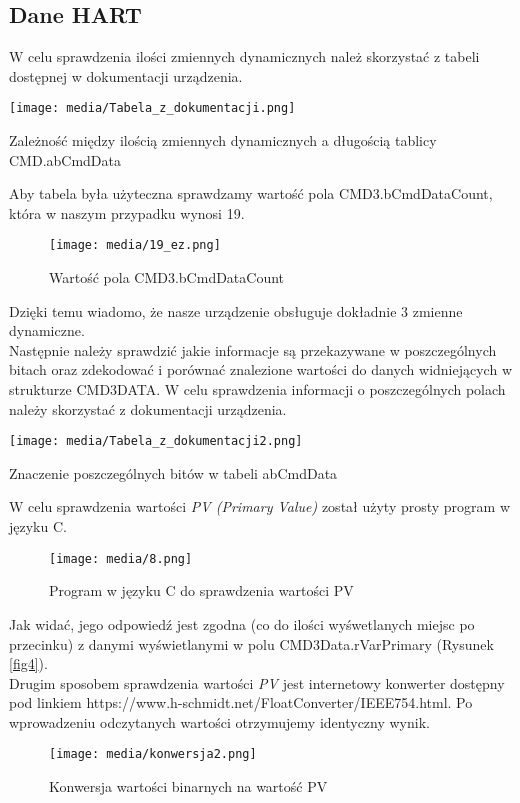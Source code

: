 \documentclass{article}
\begin{document}
\subsection{Dane HART}
W celu sprawdzenia ilości zmiennych dynamicznych należ skorzystać z  tabeli dostępnej w dokumentacji urządzenia. 
\begin{table}[H]
    \centering
    \texttt{[image: media/Tabela\_z\_dokumentacji.png]}
    \caption{Zależność między ilością zmiennych dynamicznych a długością tablicy CMD.abCmdData}
\end{table}
Aby tabela była użyteczna sprawdzamy wartość pola CMD3.bCmdDataCount, która w naszym przypadku wynosi 19.
\begin{figure}[H]
    \centering
    \texttt{[image: media/19\_ez.png]}
    \caption{Wartość pola CMD3.bCmdDataCount}
\end{figure}
Dzięki temu wiadomo, że nasze urządzenie obsługuje dokładnie 3 zmienne dynamiczne.\\

Następnie należy sprawdzić jakie informacje są przekazywane w poszczególnych bitach oraz zdekodować i porównać znalezione wartości do danych widniejących w strukturze CMD3DATA. W celu sprawdzenia informacji o poszczególnych polach należy skorzystać z dokumentacji urządzenia.
\begin{table}[H]
    \centering
    \texttt{[image: media/Tabela\_z\_dokumentacji2.png]}
    \caption{Znaczenie poszczególnych bitów w tabeli abCmdData}
\end{table}
W celu sprawdzenia wartości \textit{PV (Primary Value)} został użyty prosty program w języku C. 
\begin{figure}[H]
    \centering
    \texttt{[image: media/8.png]}
    \caption{Program w języku C do sprawdzenia wartości PV}
\end{figure}
Jak widać, jego odpowiedź jest zgodna (co do ilości wyśwetlanych miejsc po przecinku) z danymi wyświetlanymi w polu CMD3Data.rVarPrimary (Rysunek \ref{fig4}).
\\
Drugim sposobem sprawdzenia wartości \textit{PV} jest internetowy konwerter dostępny pod linkiem https://www.h-schmidt.net/FloatConverter/IEEE754.html. Po wprowadzeniu odczytanych wartości otrzymujemy identyczny wynik. 
\begin{figure}[H]
    \centering
    \texttt{[image: media/konwersja2.png]}
    \caption{Konwersja wartości binarnych na wartość PV}
\end{figure}
\end{document}
